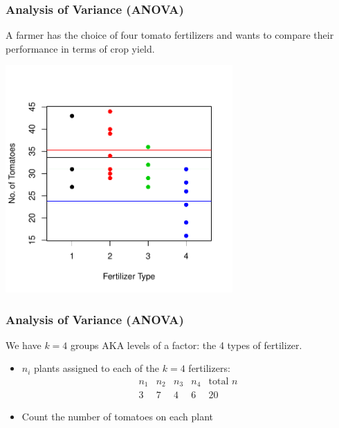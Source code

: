\documentclass[handout]{beamer}
\newcommand{\blue}[1]{\textcolor{blue2}{#1}}
\begin{document}
\begin{frame}[fragile]
\frametitle{Analysis of Variance (ANOVA)}
A farmer has the choice of four tomato fertilizers and wants to compare their performance in terms of crop yield.
\begin{center}
\includegraphics[width=0.65\textwidth]{figure/lec22-004}
\end{center}

\end{frame}


\begin{frame}[fragile]
\frametitle{Analysis of Variance (ANOVA)}

We have $k=4$ groups AKA \blue{levels of a factor}: the 4 types of fertilizer.  

\begin{itemize}
\pause\item $n_i$ plants assigned to each of the $k=4$ fertilizers:
\[
\begin{array}{cccc|c}
n_1 & n_2 & n_3 & n_4 &\mbox{total }n\\
\hline
3 & 7 & 4 & 6 & 20
\end{array}
\]
\pause \item Count the number of tomatoes on each plant
\end{itemize}

\end{frame}
\end{document}

